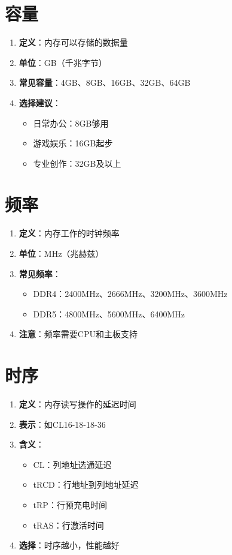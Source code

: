 \documentclass[12pt,UTF8]{ctexbook}
\begin{document}
\section{容量}

\begin{enumerate}
    \item \textbf{定义}：内存可以存储的数据量
    \item \textbf{单位}：GB（千兆字节）
    \item \textbf{常见容量}：4GB、8GB、16GB、32GB、64GB
    \item \textbf{选择建议}：
    \begin{itemize}[leftmargin=2em]
        \item 日常办公：8GB够用
        \item 游戏娱乐：16GB起步
        \item 专业创作：32GB及以上
    \end{itemize}
\end{enumerate}

\section{频率}

\begin{enumerate}
    \item \textbf{定义}：内存工作的时钟频率
    \item \textbf{单位}：MHz（兆赫兹）
    \item \textbf{常见频率}：
    \begin{itemize}[leftmargin=2em]
        \item DDR4：2400MHz、2666MHz、3200MHz、3600MHz
        \item DDR5：4800MHz、5600MHz、6400MHz
    \end{itemize}
    \item \textbf{注意}：频率需要CPU和主板支持
\end{enumerate}

\section{时序}

\begin{enumerate}
    \item \textbf{定义}：内存读写操作的延迟时间
    \item \textbf{表示}：如CL16-18-18-36
    \item \textbf{含义}：
    \begin{itemize}[leftmargin=2em]
        \item CL：列地址选通延迟
        \item tRCD：行地址到列地址延迟
        \item tRP：行预充电时间
        \item tRAS：行激活时间
    \end{itemize}
    \item \textbf{选择}：时序越小，性能越好
\end{enumerate}
\end{document}
